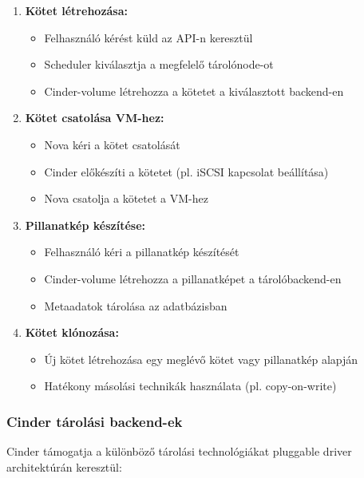 \documentclass[a4paper,12pt]{article}
\begin{document}
    \begin{enumerate}
        \item \textbf{Kötet létrehozása:}
        \begin{itemize}
            \item Felhasználó kérést küld az API-n keresztül
            \item Scheduler kiválasztja a megfelelő tárolónode-ot
            \item Cinder-volume létrehozza a kötetet a kiválasztott backend-en
        \end{itemize}

        \item \textbf{Kötet csatolása VM-hez:}
        \begin{itemize}
            \item Nova kéri a kötet csatolását
            \item Cinder előkészíti a kötetet (pl. iSCSI kapcsolat beállítása)
            \item Nova csatolja a kötetet a VM-hez
        \end{itemize}

        \item \textbf{Pillanatkép készítése:}
        \begin{itemize}
            \item Felhasználó kéri a pillanatkép készítését
            \item Cinder-volume létrehozza a pillanatképet a tárolóbackend-en
            \item Metaadatok tárolása az adatbázisban
        \end{itemize}

        \item \textbf{Kötet klónozása:}
        \begin{itemize}
            \item Új kötet létrehozása egy meglévő kötet vagy pillanatkép alapján
            \item Hatékony másolási technikák használata (pl. copy-on-write)
        \end{itemize}
    \end{enumerate}

    \subsubsection{Cinder tárolási backend-ek}

    Cinder támogatja a különböző tárolási technológiákat pluggable driver architektúrán keresztül:
\end{document}
